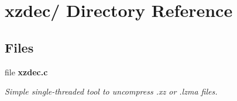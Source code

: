 \section{xzdec/ Directory Reference}
\label{dir_fb8a4ba6c207a1908b173dd397a38a35}
\subsection*{Files}
\begin{DoxyCompactItemize}
\item 
file {\bf xzdec.\-c}
\begin{DoxyCompactList}\small\item\em Simple single-\/threaded tool to uncompress .xz or .lzma files. \end{DoxyCompactList}\end{DoxyCompactItemize}

